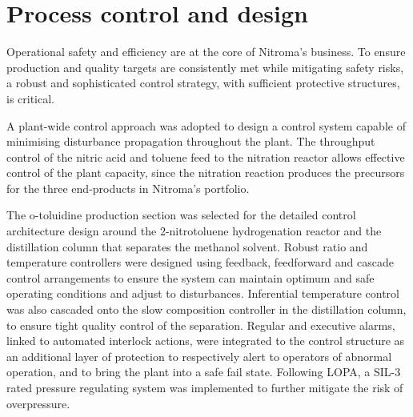 \section*{Process control and design}

Operational safety and efficiency are at the core of Nitroma's business. To ensure production and quality targets are consistently met while mitigating safety risks, a robust and sophisticated control strategy, with sufficient protective structures, is critical.

A plant-wide control approach was adopted to design a control system capable of minimising disturbance propagation throughout the plant.  The throughput control of the nitric acid and toluene feed to the nitration reactor allows effective control of the plant capacity, since the nitration reaction produces the precursors for the three end-products in Nitroma's portfolio.   


The o-toluidine production section was selected for the detailed control architecture design around the 2-nitrotoluene hydrogenation reactor and the distillation column that separates the methanol solvent. Robust ratio and temperature controllers were designed using feedback, feedforward and cascade control arrangements to ensure the system can maintain optimum and safe operating conditions and adjust to disturbances. Inferential temperature control was also cascaded onto the slow composition controller in the distillation column, to ensure tight quality control of the separation. 
Regular and executive alarms, linked to automated interlock actions, were integrated to the control structure as an additional layer of protection to respectively alert to operators of abnormal operation, and to bring the plant into a safe fail state. Following LOPA, a SIL-3 rated pressure regulating system was implemented to further mitigate the risk of overpressure.




